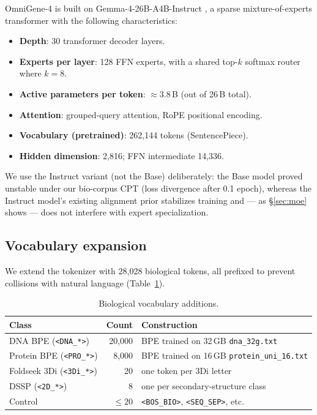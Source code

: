 \documentclass[11pt]{article}
\begin{document}
OmniGene-4 is built on Gemma-4-26B-A4B-Instruct \citep{gemmateam2025}, a sparse mixture-of-experts transformer with the following characteristics:
\begin{itemize}\setlength\itemsep{0pt}
\item \textbf{Depth}: 30 transformer decoder layers.
\item \textbf{Experts per layer}: 128 FFN experts, with a shared top-$k$ softmax router where $k=8$.
\item \textbf{Active parameters per token}: $\approx 3.8$\,B (out of 26\,B total).
\item \textbf{Attention}: grouped-query attention, RoPE positional encoding.
\item \textbf{Vocabulary (pretrained)}: 262{,}144 tokens (SentencePiece).
\item \textbf{Hidden dimension}: 2{,}816; FFN intermediate 14{,}336.
\end{itemize}

We use the Instruct variant (not the Base) deliberately: the Base model proved unstable under our bio-corpus CPT (loss divergence after 0.1 epoch), whereas the Instruct model's existing alignment prior stabilizes training and --- as \S\ref{sec:moe} shows --- does not interfere with expert specialization.

\subsection{Vocabulary expansion}

We extend the tokenizer with 28{,}028 biological tokens, all prefixed to prevent collisions with natural language (Table~\ref{tab:vocab}).

\begin{table}[H]
\centering
\small
\caption{Biological vocabulary additions.}
\label{tab:vocab}
\begin{tabular}{lrl}
\toprule
\textbf{Class} & \textbf{Count} & \textbf{Construction} \\
\midrule
DNA BPE (\texttt{<DNA\_*>})   & 20{,}000 & BPE \citep{sennrich2016bpe} trained on 32\,GB \texttt{dna\_32g.txt} \\
Protein BPE (\texttt{<PRO\_*>}) &  8{,}000 & BPE trained on 16\,GB \texttt{protein\_uni\_16.txt} \\
Foldseek 3Di (\texttt{<3Di\_*>})  &     20 & one token per 3Di letter \citep{vankempen2024foldseek} \\
DSSP (\texttt{<2D\_*>})        &      8 & one per secondary-structure class \citep{kabsch1983dssp} \\
Control                      & $\leq 20$ & \texttt{<BOS\_BIO>}, \texttt{<SEQ\_SEP>}, etc. \\
\bottomrule
\end{tabular}
\end{table}
\end{document}
